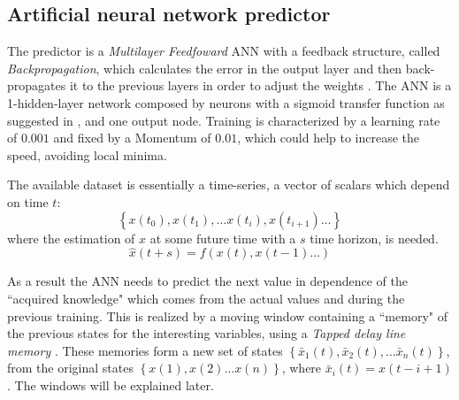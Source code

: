 \documentclass{sig-alternate-sigmod07}
\begin{document}
\subsection{Artificial neural network predictor}

The predictor is a \textit{Multilayer Feedfoward} ANN with a feedback structure, called \textit{Backpropagation}, which calculates the error in the output layer and then back-propagates it to the previous layers in order to adjust the weights \cite{rumelhart1985learning}. The ANN is a 1-hidden-layer network composed by neurons with a sigmoid transfer function as suggested in \cite{lecun2012efficient}, and one output node. Training is characterized by a learning rate of $0.001$ and fixed by a Momentum of $0.01$, which could help to increase the speed, avoiding local minima. %

The available dataset is essentially a time-series, a vector of scalars which depend on time $t$: 
\begin{displaymath}\left\{x(t_0), x(t_1), \ldots x(t_i), x(t_{i+1}) \ldots \right\}\end{displaymath}
where the estimation of $x$ at some future time with a $s$ time horizon, is needed.
\begin{displaymath}\hat{x}(t+s) = f\left(x(t), x(t-1) \ldots \right) \end{displaymath}

As a result the ANN needs to predict the next value in dependence of the ``acquired knowledge" which comes from the actual values and during the previous training. This is realized by a moving window containing a ``memory" of the previous states for the interesting variables, using a \textit{Tapped delay line memory} \cite{mozer2007neural}. These memories form a new set of states $\left\{\bar{x}_1(t), \bar{x}_2(t), \ldots \bar{x}_n(t)\right\}$, from the original states $\left\{x(1), x(2) \ldots x(n)\right\}$, where $\bar{x}_i(t) = x(t - i + 1)$. The windows will be explained later. 
\end{document}
